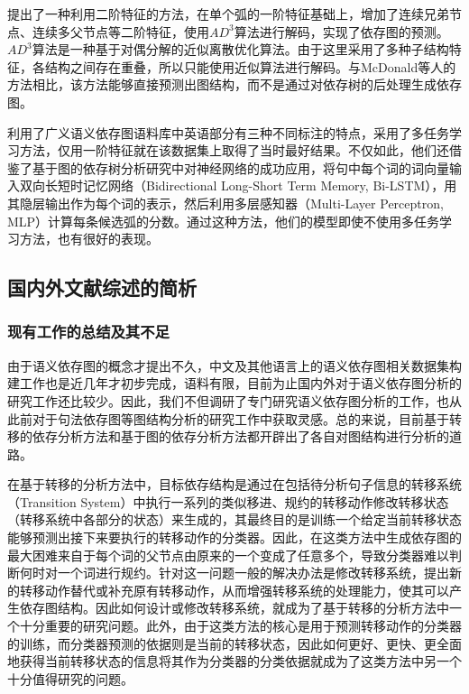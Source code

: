 提出了一种利用二阶特征的方法，在单个弧的一阶特征基础上，增加了连续兄弟节点、连续多父节点等二阶特征，使用$AD^3$算法进行解码，实现了依存图的预测。$AD^3$算法是一种基于对偶分解的近似离散优化算法。由于这里采用了多种子结构特征，各结构之间存在重叠，所以只能使用近似算法进行解码。与McDonald等人的方法相比，该方法能够直接预测出图结构，而不是通过对依存树的后处理生成依存图。

利用了广义语义依存图语料库中英语部分有三种不同标注的特点，采用了多任务学习方法，仅用一阶特征就在该数据集上取得了当时最好结果。不仅如此，他们还借鉴了基于图的依存树分析研究中对神经网络的成功应用，将句中每个词的词向量输入双向长短时记忆网络（Bidirectional Long-Short Term Memory, Bi-LSTM），用其隐层输出作为每个词的表示，然后利用多层感知器（Multi-Layer Perceptron, MLP）计算每条候选弧的分数。通过这种方法，他们的模型即使不使用多任务学习方法，也有很好的表现。


\subsection{国内外文献综述的简析}
\subsubsection{现有工作的总结及其不足}
\label{drawback}

由于语义依存图的概念才提出不久，中文及其他语言上的语义依存图相关数据集构建工作也是近几年才初步完成，语料有限，目前为止国内外对于语义依存图分析的研究工作还比较少。因此，我们不但调研了专门研究语义依存图分析的工作，也从此前对于句法依存图等图结构分析的研究工作中获取灵感。总的来说，目前基于转移的依存分析方法和基于图的依存分析方法都开辟出了各自对图结构进行分析的道路。

在基于转移的分析方法中，目标依存结构是通过在包括待分析句子信息的转移系统（Transition System）中执行一系列的类似移进、规约的转移动作修改转移状态（转移系统中各部分的状态）来生成的，其最终目的是训练一个给定当前转移状态能够预测出接下来要执行的转移动作的分类器。因此，在这类方法中生成依存图的最大困难来自于每个词的父节点由原来的一个变成了任意多个，导致分类器难以判断何时对一个词进行规约。针对这一问题一般的解决办法是修改转移系统，提出新的转移动作替代或补充原有转移动作，从而增强转移系统的处理能力，使其可以产生依存图结构。因此如何设计或修改转移系统，就成为了基于转移的分析方法中一个十分重要的研究问题。此外，由于这类方法的核心是用于预测转移动作的分类器的训练，而分类器预测的依据则是当前的转移状态，因此如何更好、更快、更全面地获得当前转移状态的信息将其作为分类器的分类依据就成为了这类方法中另一个十分值得研究的问题。

